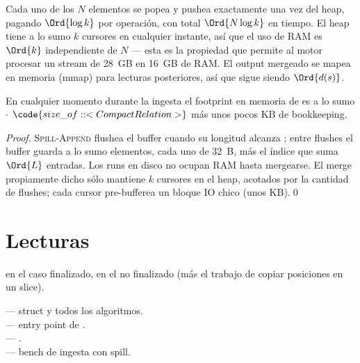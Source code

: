 \begin{complexity}
Cada uno de los $N$ elementos se popea y pushea exactamente una
vez del heap, pagando $\Ord{\log k}$ por operación, con total
$\Ord{N \log k}$ en tiempo. El heap tiene a lo sumo $k$ cursores
en cualquier instante, así que el uso de RAM es $\Ord{k}$
independiente de $N$ --- esta es la propiedad que permite al
motor procesar un stream de 28~GB en 16~GB de RAM. El output
mergeado se mapea en memoria (mmap) para lecturas posteriores,
así que  sigue siendo $\Ord{d(s)}$.
\end{complexity}

\begin{theorem}
En cualquier momento durante la ingesta el footprint en memoria
de  es a lo sumo 
$\cdot$ $\code{size\_of::<CompactRelation>}$ más unos pocos KB de
bookkeeping.
\end{theorem}

\begin{proof}
\textsc{Spill-Append} flushea el buffer cuando su longitud
alcanza ; entre flushes el buffer guarda a lo
sumo  elementos, cada uno de 32~B, más el
índice  que suma $\Ord{L}$
entradas. Los runs en disco no ocupan RAM hasta mergearse. El
merge propiamente dicho sólo mantiene $k$ cursores en el heap,
acotados por la cantidad de flushes; cada cursor pre-bufferea un
bloque IO chico (unos KB).\qed
\end{proof}

\section{Lecturas}

\begin{algorithm}
\caption{\textsc{Get-Edges}}\label{alg:spill-get-edges}
\end{algorithm}

\begin{complexity}
 en el caso finalizado,  en el no
finalizado (más el trabajo de copiar posiciones en un slice).
\end{complexity}

\begin{inthecode}
 --- struct y todos
los algoritmos.\\
 --- entry point
de .\\
 ---
.\\
 ---
bench de ingesta con spill.
\end{inthecode}
